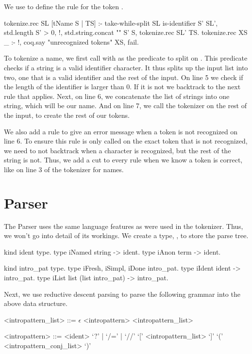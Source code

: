 \documentclass[thesis.tex]{subfiles}
\begin{document}
{{We use  to define the rule for the token .
\begin{elpicode}
  tokenize.rec SL [tName S | TS] :-
    take-while-split SL is-identifier S' SL',
    { std.length S' } > 0, !,
    std.string.concat "" S' S,
    tokenize.rec SL' TS.
  tokenize.rec XS _ :- !, 
    coq.say "unrecognized tokens" XS, fail.  
\end{elpicode}
To tokenize a name, we first call  with as the predicate to split on . This predicate checks if a string is a valid identifier character. It thus splits up the input list into two, one that is a valid identifier and the rest of the input. On line 5 we check if the length of the identifier is larger than 0. If it is not we backtrack to the next rule that applies. Next, on line 6, we concatenate the list of strings into one string, which will be our name. And on line 7, we call the tokenizer on the rest of the input, to create the rest of our tokens.

We also add a rule to give an error message when a token is not recognized on line 6. To ensure this rule is only called on the exact token that is not recognized, we need to not backtrack when a character is recognized, but the rest of the string is not. Thus, we add a cut to every rule when we know a token is correct, like on line 3 of the tokenizer for names.

\section{Parser}\label{ssec:parser}
The Parser uses the same language features as were used in the tokenizer. Thus, we won't go into detail of its workings. We create a type, , to store the parse tree.
\begin{elpicode}
  kind ident type.
  type iNamed string -> ident.
  type iAnon term -> ident.

  kind intro_pat type.
  type iFresh, iSimpl, iDone intro_pat.
  type iIdent ident -> intro_pat.
  type iList list (list intro_pat) -> intro_pat.
\end{elpicode}
Next, we use reductive descent parsing to parse the following grammar into the above data structure.
\begin{grammar}
    <intropattern\_list> ::= $\epsilon$
    \alt <intropattern> <intropattern\_list>

    <intropattern> ::= <ident>
    \alt `?' | `/=' | `//'
    \alt `[' <intropattern\_list> `]'
    \alt `(' <intropattern\_conj\_list> `)'


\end{grammar}}}
\end{document}
